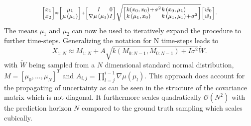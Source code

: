         \begin{equation}
        \label{linearized ground truth}
        \footnotesize
        \scriptscriptstyle
        \setlength{\arraycolsep}{0.3pt}
        \medmuskip = 1mu %
        \centering
            \left[\begin{array}{l}
            x_{1} \\
            x_{2}
            \end{array}\right] \approx\left[\begin{array}{c}
            \mu_{1} \\
            \mu\left(\mu_{1}\right)
            \end{array}\right]+\left[\begin{array}{cc}
            I & 0 \\
            \nabla \mu\left(\mu_{1}\right) & I
            \end{array}\right]
            \sqrt{
            \left[\begin{array}{ll}k(x_0, x_0) + \sigma ^2 & k\left(x_0, \mu_1\right) \\ k\left(\mu_1, x_0\right) & k\left(\mu_1, \mu_1\right)+\sigma ^2\end{array}\right]}
            \left[\begin{array}{c}
            \tilde{w_0} \\
            \tilde{w_1}
            \end{array}\right].
        \end{equation}
        The means $\mu_1$ and $\mu_2$ can now be used to iteratively expand the procedure to further time-steps. Generalizing the notation for N time-steps leads to 
        \begin{equation}
        \label{generalized linearization of ground truth}
            X_{1: N} \approx M_{1: N}+A \sqrt{k\left(M_{0: N-1}, M_{0: N-1}\right)+I \sigma^2} \tilde{W}.
        \end{equation}
        with $\tilde W $ being sampled from a $N $ dimensional standard normal distribution, $M = [\mu_0,...,\mu_N]^T$ and $A_{i, j}=\prod_{l=j}^{i-1} \nabla \mu\left(\mu_{l}\right)$. This approach does account for the propagating of uncertainty as can be seen in the structure of the covariance matrix which is not diagonal. It furthermore scales quadratically $\mathcal O(N^2)$ with the prediction horizon $N$ compared to the ground truth sampling which scales cubically.